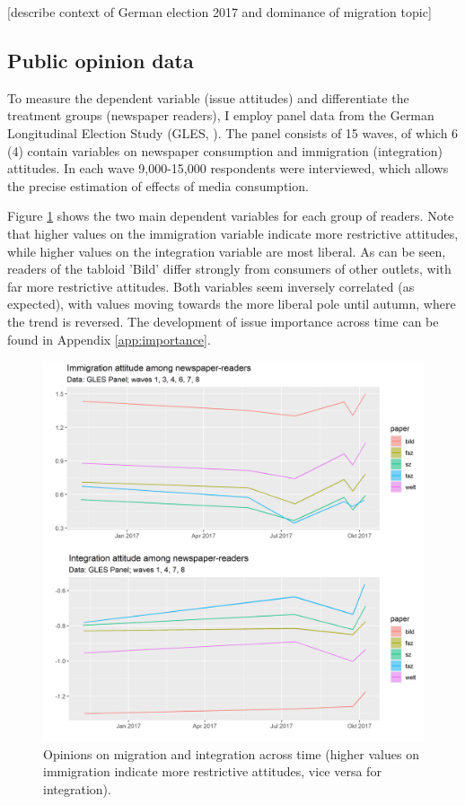 \documentclass{article}
\begin{document}
[describe context of German election 2017 and dominance of migration topic]

\subsection{Public opinion data}

To measure the dependent variable (issue attitudes) and differentiate the treatment groups (newspaper readers), I employ panel data from the German Longitudinal Election Study (GLES, \cite{GLES2019LongTermTracking}). The panel consists of 15 waves, of which 6 (4) contain variables on newspaper consumption and immigration (integration) attitudes. In each wave 9,000-15,000 respondents were interviewed, which allows the precise estimation of effects of media consumption.

Figure \ref{fig:issues} shows the two main dependent variables for each group of readers. Note that higher values on the immigration variable indicate more restrictive attitudes, while higher values on the integration variable are most liberal. As can be seen, readers of the tabloid 'Bild' differ strongly from consumers of other outlets, with far more restrictive attitudes. Both variables seem inversely correlated (as expected), with values moving towards the more liberal pole until autumn, where the trend is reversed. The development of issue importance across time can be found in Appendix \ref{app:importance}.

\begin{figure}[!ht]
    \centering
    \includegraphics[width=\textwidth]{paper/vis/issues_readers.png}
    \caption{Opinions on migration and integration across time (higher values on immigration indicate more restrictive attitudes, vice versa for integration).}
    \label{fig:issues}
\end{figure}
\end{document}
